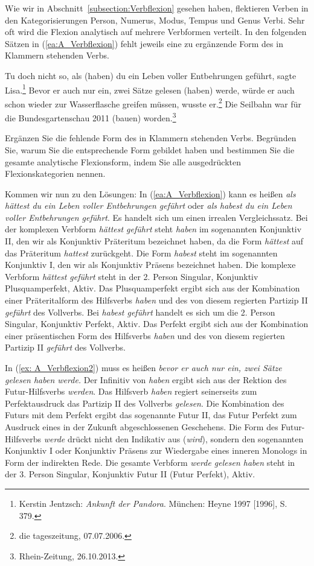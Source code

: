 Wie wir in Abschnitt~\ref{subsection:Verbflexion} gesehen haben, flektieren Verben in den Kategorisierungen Person, Numerus, Modus, Tempus und Genus Verbi. Sehr oft wird die Flexion analytisch auf mehrere Verbformen verteilt. In den folgenden Sätzen in (\ref{ea:A_Verbflexion}) fehlt jeweils eine zu ergänzende Form des in Klammern stehenden Verbs.

\ea \label{ea:A_Verbflexion} 
\ea \label{ea:A_Verbflexion1} Tu doch nicht so, als (haben) du ein Leben voller Entbehrungen geführt, sagte Lisa.\footnote{Kerstin Jentzsch: \textit{Ankunft der Pandora}. München: Heyne 1997 [1996], S. 379.}
\ex \label{ex: A_Verbflexion2} Bevor er auch nur ein, zwei Sätze gelesen (haben) werde, würde er auch schon wieder zur Wasserflasche greifen müssen, wusste er.\footnote{die tageszeitung, 07.07.2006.}
\ex \label{ex:A_Verbflexion3} Die Seilbahn war für die Bundesgartenschau 2011 (bauen) worden.\footnote{Rhein-Zeitung, 26.10.2013.}
\z   
\z 

Ergänzen Sie die fehlende Form des in Klammern stehenden Verbs. Begründen Sie, warum Sie die entsprechende Form gebildet haben und bestimmen Sie die gesamte analytische Flexionsform, indem Sie alle ausgedrückten Flexionskategorien nennen. 


Kommen wir nun zu den Lösungen: In (\ref{ea:A_Verbflexion}) kann es heißen \textit{als hättest du ein Leben voller Entbehrungen geführt} oder \textit{als habest du ein Leben voller Entbehrungen geführt}. Es handelt sich um einen irrealen Vergleichssatz. Bei der komplexen Verbform \textit{hättest geführt} steht \textit{haben} im sogenannten Konjunktiv II, den wir als Konjunktiv Präteritum bezeichnet haben, da die Form \textit{hättest} auf das Präteritum \textit{hattest} zurückgeht. Die Form \textit{habest} steht im sogenannten Konjunktiv I, den wir als Konjunktiv Präsens bezeichnet haben. Die komplexe Verbform \textit{hättest geführt} steht in der 2. Person Singular, Konjunktiv Plusquamperfekt, Aktiv. Das Plusquamperfekt ergibt sich aus der Kombination einer Präteritalform des Hilfsverbs \textit{haben} und des von diesem regierten Partizip II \textit{geführt} des Vollverbs. Bei \textit{habest geführt} handelt es sich um die 2. Person Singular, Konjunktiv Perfekt, Aktiv. Das Perfekt ergibt sich aus der Kombination einer präsentischen Form des Hilfsverbs \textit{haben} und des von diesem regierten Partizip II \textit{geführt} des Vollverbs.   

In (\ref{ex: A_Verbflexion2}) muss es heißen \textit{bevor er auch nur ein, zwei Sätze gelesen haben werde.} Der Infinitiv von \textit{haben} ergibt sich aus der Rektion des Futur-Hilfsverbs \textit{werden}. Das Hilfsverb \textit{haben} regiert seinerseits zum Perfektausdruck das Partizip II des Vollverbs \textit{gelesen}. Die Kombination des Futurs mit dem Perfekt ergibt das sogenannte Futur II, das Futur Perfekt zum Ausdruck eines in der Zukunft abgeschlossenen Geschehens. Die Form des Futur-Hilfsverbs \textit{werde} drückt nicht den Indikativ aus (\textit{wird}), sondern den sogenannten Konjunktiv I oder Konjunktiv Präsens zur Wiedergabe eines inneren Monologs in Form der indirekten Rede. Die gesamte Verbform \textit{werde gelesen haben} steht in der 3. Person Singular, Konjunktiv Futur II (Futur Perfekt), Aktiv. 

